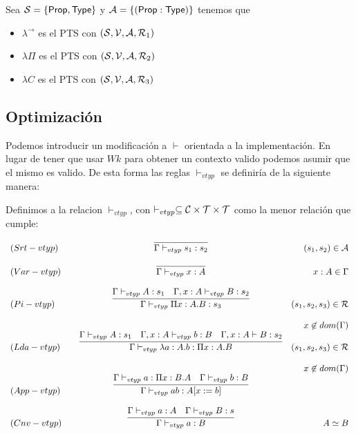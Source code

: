 Sea $\mathcal{S} = \{\mathsf{Prop}, \mathsf{Type}\}$ y $\mathcal{A} = \{(\mathsf{Prop} : \mathsf{Type})\}$ tenemos que

\begin{itemize}
    \item $\lambda^{\rightarrow}$ es el PTS con $(\mathcal{S}, \mathcal{V}, \mathcal{A}, \mathcal{R}_{1})$
    \item $\lambda \Pi$ es el PTS con $(\mathcal{S}, \mathcal{V}, \mathcal{A}, \mathcal{R}_{2})$
    \item $\lambda C$ es el PTS con $(\mathcal{S}, \mathcal{V}, \mathcal{A}, \mathcal{R}_{3})$
\end{itemize}

\subsection{Optimización}

Podemos introducir un modificación a $\vdash$ orientada a la implementación. En lugar de tener que usar $Wk$ para
obtener un contexto valido podemos asumir que el mismo es valido. De esta forma las reglas $\vdash_{vtyp}$ se definiría de la 
siguiente manera:

\begin{definition}
Definimos a la relacion $\vdash_{vtyp}$, con $\vdash_{vtyp} \subseteq \mathcal{C}\times\mathcal{T}\times\mathcal{T}$ como
la menor relación que cumple:


\[
\begin{array}{llcr}
	(Srt-vtyp) & &\infer{\Gamma \vdash_{vtyp} s_{1} : s_{2}}{} & (s_{1},s_{2}) \in\cA \\ \\ 
	(Var-vtyp) & &\infer{\Gamma \vdash_{vtyp} x : A}{} & x:A \in\Gamma \\ \\
	(Pi-vtyp)  & &\infer{\Gamma \vdash_{vtyp} \Pi x:A.B : s_{3}}{\Gamma\vdash_{vtyp} A:s_{1} & \Gamma, x:A \vdash_{vtyp} B:s_{2}} &  (s_1,s_2,s_3)\in\cR\\ \\
               & &                                             & x \not\in dom(\Gamma)\\
	(Lda-vtyp) & &\infer{\Gamma \vdash_{vtyp} \lambda a:A.b : \Pi x:A.B }{\Gamma\vdash_{vtyp} A:s_{1} & \Gamma, x:A \vdash_{vtyp} b:B &\Gamma, x:A \vdash B:s_{2}} &  (s_1,s_2,s_3)\in\cR\\ \\
               & &                                             & x \not\in dom(\Gamma)\\
	(App-vtyp) & &\infer{\Gamma \vdash_{vtyp} a b : A[x:= b] }{\Gamma\vdash_{vtyp} a : \Pi x:B.A & \Gamma \vdash_{vtyp} b:B} &  \\ \\
	(Cnv-vtyp) & &\infer{\Gamma \vdash_{vtyp} a:B}{\Gamma\vdash_{vtyp} a:A & \Gamma\vdash_{vtyp} B:s} & A \simeq B \\ \\
	
\end{array}
\]

\end{definition}

